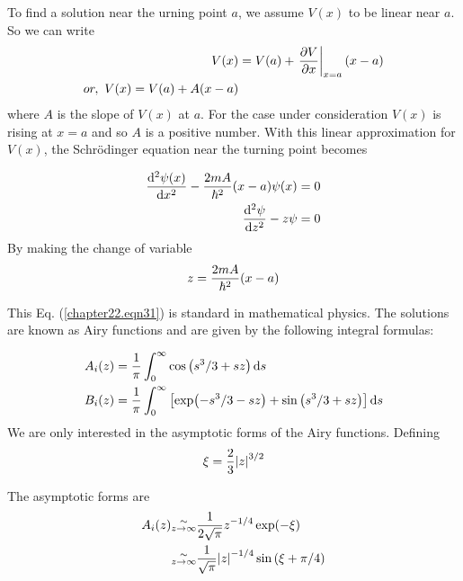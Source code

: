 
To find a solution near the urning point $a$, we assume $V(x)$ to be linear near $a$. So we can write
\begin{align}
V(x) &= V(a) + \eval{\pdv{V}{x}}_{x=a} \qty(x - a) \nonumber\\
\label{chapter22.eqn28}
or, \ V(x) = V(a) + A \qty(x-a)
\end{align}
where $A$ is the slope of $V(x)$ at $a$. For the case under consideration $V(x)$ is rising at $x=a$ and so $A$ is a positive number. With this linear approximation for $V(x)$, the Schr\"{o}dinger equation near the turning point becomes

\begin{align}
	\dv[2]{\psi(x)}{x} - \frac{2 m A}{\hbar^2} \qty(x-a) \psi(x) &= 0 \nonumber\\
	\label{chapter22.eqn31}
	\dv[2]{\psi}{z} - z \psi &= 0 \\
\end{align}
By making the change of variable
\begin{equation}
	\label{chapter22.eqn30}
	z = \frac{2 m A}{\hbar^2} \qty(x-a)
\end{equation}

This Eq. (\ref{chapter22.eqn31}) is standard in mathematical physics. The solutions are known as Airy functions and are given by the following integral formulas:

\begin{align}
\label{chapter22.eqn32}
	A_i(z) &= \frac{1}{\pi} \int_{0}^{\infty} \cos \qty(s^3/3 + s z) \dd{s} \\
\label{chapter22.eqn33}
	B_i(z) &= \frac{1}{\pi} \int_{0}^{\infty} \left[ \exp(-s^3/3 - s z) + \sin\qty(s^3/3 + s z) \right] \dd{s}
\end{align}
We are only interested in the asymptotic forms of the Airy functions. Defining
\begin{equation}
	\xi = \frac{2}{3} \abs{z}^{3/2}
\end{equation}

The asymptotic forms are
\begin{align}
A_i(z) &\substack{\sim \\ z \rightarrow \infty} \frac{1}{2 \sqrt{\pi}} z^{-1/4} \exp(-\xi) \nonumber \\
&\substack{\sim \\ z \rightarrow \infty} \frac{1}{\sqrt{\pi}} \abs{z}^{-1/4} \sin\qty(\xi + \pi / 4)
\label{chapter22.eqn34}
\end{align}


